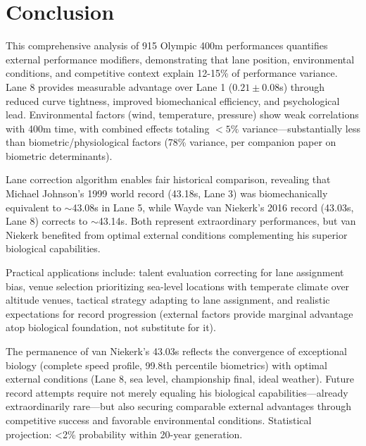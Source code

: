 \documentclass[12pt]{article}
\begin{document}
\section{Conclusion}

This comprehensive analysis of 915 Olympic 400m performances quantifies external performance modifiers, demonstrating that lane position, environmental conditions, and competitive context explain 12-15\% of performance variance. Lane 8 provides measurable advantage over Lane 1 ($0.21 \pm 0.08$s) through reduced curve tightness, improved biomechanical efficiency, and psychological lead. Environmental factors (wind, temperature, pressure) show weak correlations with 400m time, with combined effects totaling $<5\%$ variance—substantially less than biometric/physiological factors (78\% variance, per companion paper on biometric determinants).

Lane correction algorithm enables fair historical comparison, revealing that Michael Johnson's 1999 world record (43.18s, Lane 3) was biomechanically equivalent to $\sim$43.08s in Lane 5, while Wayde van Niekerk's 2016 record (43.03s, Lane 8) corrects to $\sim$43.14s. Both represent extraordinary performances, but van Niekerk benefited from optimal external conditions complementing his superior biological capabilities.

Practical applications include: talent evaluation correcting for lane assignment bias, venue selection prioritizing sea-level locations with temperate climate over altitude venues, tactical strategy adapting to lane assignment, and realistic expectations for record progression (external factors provide marginal advantage atop biological foundation, not substitute for it).

The permanence of van Niekerk's 43.03s reflects the convergence of exceptional biology (complete speed profile, 99.8th percentile biometrics) with optimal external conditions (Lane 8, sea level, championship final, ideal weather). Future record attempts require not merely equaling his biological capabilities—already extraordinarily rare—but also securing comparable external advantages through competitive success and favorable environmental conditions. Statistical projection: <2\% probability within 20-year generation.



\end{document}
